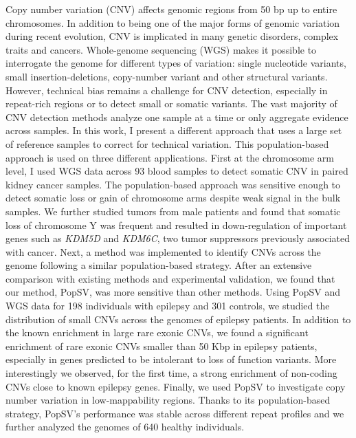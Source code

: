 Copy number variation (CNV) affects genomic regions from 50 bp up to entire chromosomes.
In addition to being one of the major forms of genomic variation during recent evolution, CNV is implicated in many genetic disorders, complex traits and cancers.
Whole-genome sequencing (WGS) makes it possible to interrogate the genome for different types of variation: single nucleotide variants, small insertion-deletions, copy-number variant and other structural variants.
However, technical bias remains a challenge for CNV detection, especially in repeat-rich regions or to detect small or somatic variants.
The vast majority of CNV detection methods analyze one sample at a time or only aggregate evidence across samples.
In this work, I present a different approach that uses a large set of reference samples to correct for technical variation.
This population-based approach is used on three different applications.
First at the chromosome arm level, I used WGS data across 93 blood samples to detect somatic CNV in paired kidney cancer samples.
The population-based approach was sensitive enough to detect somatic loss or gain of chromosome arms despite weak signal in the bulk samples.
We further studied tumors from male patients and found that somatic loss of chromosome Y was frequent and resulted in down-regulation of important genes such as {\it KDM5D} and {\it KDM6C}, two tumor suppressors previously associated with cancer.
Next, a method was implemented to identify CNVs across the genome following a similar population-based strategy.
After an extensive comparison with existing methods and experimental validation, we found that our method, {\sf PopSV}, was more sensitive than other methods.
Using {\sf PopSV} and WGS data for 198 individuals with epilepsy and 301 controls, we studied the distribution of small CNVs across the genomes of epilepsy patients.
In addition to the known enrichment in large rare exonic CNVs, we found a significant enrichment of rare exonic CNVs smaller than 50 Kbp in epilepsy patients, especially in genes predicted to be intolerant to loss of function variants.
More interestingly we observed, for the first time, a strong enrichment of non-coding CNVs close to known epilepsy genes.
Finally, we used {\sf PopSV} to investigate copy number variation in low-mappability regions.
Thanks to its population-based strategy, {\sf PopSV}'s performance was stable across different repeat profiles and we further analyzed the genomes of 640 healthy individuals.
